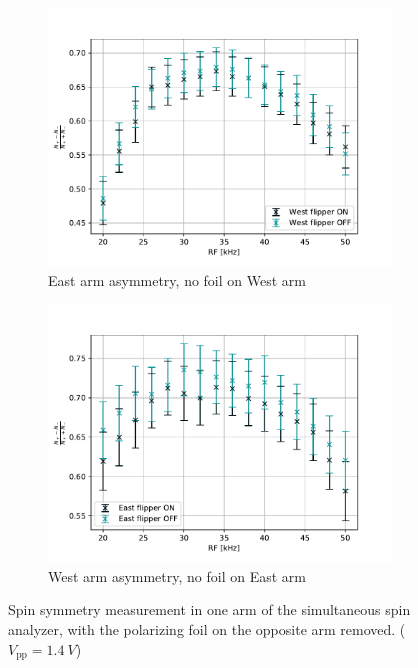 \begin{figure}
\centering
\begin{subfigure}{.5\textwidth} 
  \centering
  \includegraphics[width=\textwidth]{figures/SSA_east_arm_no_west_foil.pdf}
  \caption{East arm asymmetry, no foil on West arm }\label{subfig:SSA_east_arm_no_west_foil}
\end{subfigure}%
\begin{subfigure}{.5\textwidth}
  \centering
  \includegraphics[width=\textwidth]{figures/SSA_west_arm_no_west_foil.pdf}
  \caption{West arm asymmetry, no foil on East arm}\label{subfig:SSA_west_arm_no_west_foil}
\end{subfigure}
\caption
    {Spin symmetry measurement in one arm of the simultaneous spin analyzer, with the polarizing foil on the opposite arm removed. ($V_\text{pp}=\qty{1.4}{V}$)}
\label{fig:SSA_asym_one_foil_out}
\end{figure}

